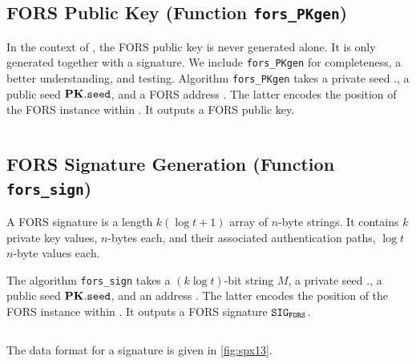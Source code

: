\begin{algorithm}
    \inputminted[breaklines,linenos,tabsize=2,mathescape,escapeinside=||]{C}{code/fors_treehash.cs}
    \caption{The \texttt{fors\_treehash algorithm.}}
    \label{alg:forstreehash}
\end{algorithm}

\subsection{FORS Public Key (Function \texttt{fors\_PKgen})}

In the context of \SPHINCSA, the FORS public key is never generated alone. It is only generated together with a signature. We include \texttt{fors\_PKgen} for completeness, a better understanding, and testing. Algorithm \texttt{fors\_PKgen} takes a private seed \sk.\seed, a public seed $\mathbf{PK}.\mathtt{seed}$, and a FORS address \ADRS. The latter encodes the position of the FORS instance within \SPHINCSA. It outputs a FORS public key.

\begin{algorithm}
    \inputminted[breaklines,linenos,tabsize=2,mathescape,escapeinside=||]{C}{code/fors_PKgen.cs}
    \caption{\texttt{ fors\_PKgen } --- Generate a FORS public key. }
    \label{alg:forspkgen}
\end{algorithm}


\subsection{FORS Signature Generation (Function \texttt{fors\_sign})}

A FORS signature is a length $k(\log t+1)$ array of $n$-byte strings. It contains $k$ private key values, $n$-bytes each, and their associated authentication paths, $\log t$ $n$-byte values each.

The algorithm \texttt{fors\_sign} takes a $(k\log t)$-bit string $M$, a private seed \sk.\seed, a public seed $\mathbf{PK}.\mathtt{seed}$, and an address \ADRS. The latter encodes the position of the FORS instance within \SPHINCSA. It outputs a FORS signature $\mathtt{SIG}_\mathtt{FORS}$.

\begin{algorithm}
    \inputminted[breaklines,linenos,tabsize=2,mathescape,escapeinside=||]{C}{code/fors_sign.cs}
    \caption{\texttt{ fors\_sign } --- Generate a FORS signature on string $M$. }
    \label{alg:forssign}
\end{algorithm}

The data format for a signature is given in \cref{fig:spx13}.

